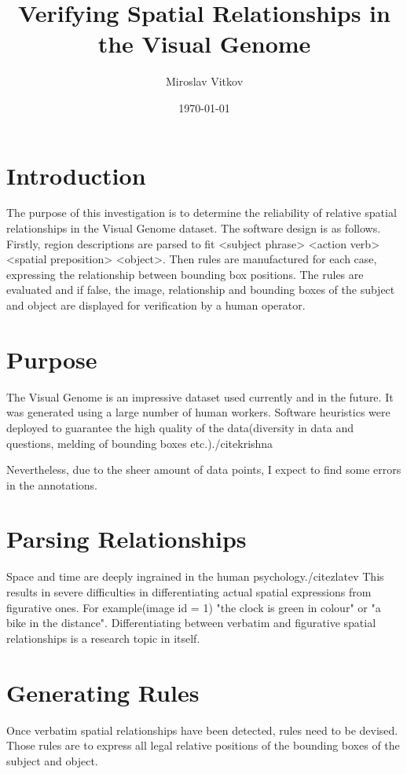 \documentclass{article}
\title{Verifying Spatial Relationships in the Visual Genome}
\author{Miroslav Vitkov}
\date{\today}
\begin{document}
\maketitle


\section{Introduction}
The purpose of this investigation is to determine the reliability of relative spatial relationships in the Visual Genome dataset.
The software design is as follows.
Firstly, region descriptions are parsed to fit <subject phrase> <action verb> <spatial preposition> <object>.
Then rules are manufactured for each case, expressing the relationship between bounding box positions.
The rules are evaluated and if false, the image, relationship and bounding boxes of the subject and object are displayed for verification by a human operator.


\section{Purpose}
The Visual Genome is an impressive dataset used currently and in the future.
It was generated using a large number of human workers.
Software heuristics were deployed to guarantee the high quality of the data(diversity in data and questions, melding of bounding boxes etc.)./cite{krishna}

Nevertheless, due to the sheer amount of data points, I expect to find some errors in the annotations.


\section{Parsing Relationships}
Space and time are deeply ingrained in the human psychology./cite{zlatev}
This results in severe difficulties in differentiating actual spatial expressions from figurative ones.
For example(image id = 1) "the clock is green in colour" or "a bike in the distance".
Differentiating between verbatim and figurative spatial relationships is a research topic in itself.


\section{Generating Rules}
Once verbatim spatial relationships have been detected, rules need to be devised.
Those rules are to express all legal relative positions of the bounding boxes of the subject and object.
\end{document}
